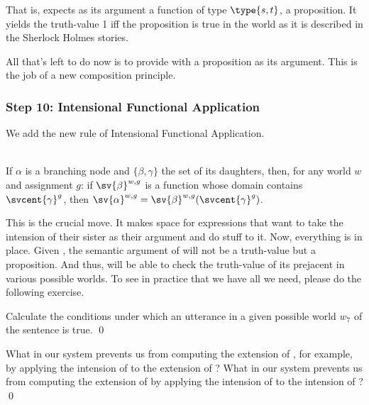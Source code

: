 That is,  expects as its argument a
function of type $\type{s,t}$, a proposition. It yields the truth-value 1 iff
the proposition is true in the world as it is described in the Sherlock Holmes
stories.

All that's left to do now is to provide  with a proposition as its argument. This is the job of a new
composition principle.

\subsubsection{Step 10: Intensional Functional Application}
\label{sec:intens-funct-appl}

We add the new rule of Intensional Functional Application.

\ex {}\\
If $\alpha$ is a branching node and $\{\beta, \gamma\}$ the set of its
daughters, then, for any world $w$ and assignment $g$: if $\sv{\beta}^{w,g}$ is
a function whose domain contains $\svcent{\gamma}^g$, then $\sv{\alpha}^{w,g} =
\sv{\beta}^{w,g} (\svcent{\gamma}^g)$. \xe

This is the crucial move. It makes space for expressions that want to take the
intension of their sister as their argument and do stuff to it. Now, everything
is in place. Given \LLast, the semantic argument of  will not be a truth-value but a proposition. And thus,
 will be able to check the
truth-value of its prejacent in various possible worlds. To see in practice that
we have all we need, please do the following exercise.

\begin{exercise}
  Calculate the conditions under which an utterance in a given possible world
  $w_7$ of the sentence  is true. \qed
\end{exercise}

\begin{exercise}
  What in our system prevents us from computing the extension of
  , for example, by applying the intension of
   to the extension of ? What in our system
  prevents us from computing the extension of  by
  applying the intension of  to the intension of
  ? \qed
\end{exercise}

